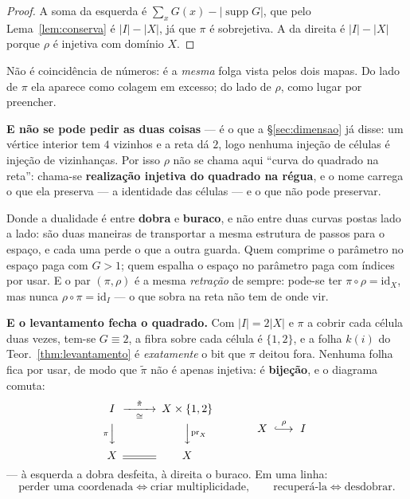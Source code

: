 \documentclass[11pt,a4paper]{article}
\newcommand{\abs}[1]{\lvert #1\rvert}
\begin{document}
\begin{proof}
A soma da esquerda é $\sum_x G(x)-\lvert\operatorname{supp}G\rvert$, que pelo
Lema~\ref{lem:conserva} é $\abs{I}-\abs{X}$, já que $\pi$ é sobrejetiva. A da
direita é $\abs{I}-\abs{X}$ porque $\rho$ é injetiva com domínio $X$.
\end{proof}

\medskip\noindent Não é coincidência de números: é a \emph{mesma} folga vista
pelos dois mapas. Do lado de $\pi$ ela aparece como colagem em excesso; do lado
de $\rho$, como lugar por preencher.

\medskip\noindent\textbf{E não se pode pedir as duas coisas} --- é o que a
§\ref{sec:dimensao} já disse: um vértice interior tem $4$ vizinhos e a reta dá
$2$, logo nenhuma injeção de células é injeção de vizinhanças. Por isso $\rho$
não se chama aqui ``curva do quadrado na reta'': chama-se \textbf{realização
injetiva do quadrado na régua}, e o nome carrega o que ela preserva --- a
identidade das células --- e o que não pode preservar.

\medskip\noindent Donde a dualidade é entre \textbf{dobra} e \textbf{buraco}, e
não entre duas curvas postas lado a lado: são duas maneiras de transportar a
mesma estrutura de passos para o espaço, e cada uma perde o que a outra guarda. Quem comprime o parâmetro no espaço paga com $G>1$;
quem espalha o espaço no parâmetro paga com índices por usar. E o par
$(\pi,\rho)$ é a mesma \emph{retração} de sempre: pode-se ter
$\pi\circ\rho=\mathrm{id}_X$, mas nunca $\rho\circ\pi=\mathrm{id}_I$ --- o que
sobra na reta não tem de onde vir.

\medskip\noindent\textbf{E o levantamento fecha o quadrado.} Com
$\abs{I}=2\abs{X}$ e $\pi$ a cobrir cada célula duas vezes, tem-se $G\equiv2$, a
fibra sobre cada célula é $\{1,2\}$, e a folha $k(i)$ do
Teor.~\ref{thm:levantamento} é \emph{exatamente} o bit que $\pi$ deitou fora.
Nenhuma folha fica por usar, de modo que $\tilde\pi$ não é apenas injetiva: é
\textbf{bijeção}, e o diagrama comuta:
\[
\begin{CD}
I @>{\tilde\pi}>{\cong}> X\times\{1,2\}\\
@V{\pi}VV @VV{\operatorname{pr}_X}V\\
X @= X
\end{CD}
\qquad\qquad
X\ \overset{\rho}{\lhook\joinrel\longrightarrow}\ I
\]
--- à esquerda a dobra desfeita, à direita o buraco. Em uma linha:
\[
\boxed{\ \text{perder uma coordenada}\iff\text{criar multiplicidade},\qquad
\text{recuperá-la}\iff\text{desdobrar}.\ }
\]
\end{document}
